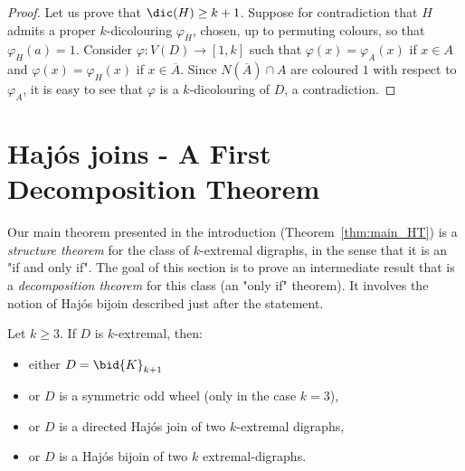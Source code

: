 \begin{proof}
    Let us prove that  $\dic(H) \geq k+1$. %
    Suppose for contradiction that $H$ admits a proper $k$-dicolouring $\varphi_H$, chosen, up to permuting colours, so that $\varphi_H(a) = 1$.
    Consider $\varphi : V(D) \to [1,k]$ such that $\varphi(x) = \varphi_A(x)$ if $x \in A$ and $\varphi(x) = \varphi_{H}(x)$ if $x \in \overline{A}$. 
    Since $N(\overline{A}) \cap A$ are coloured $1$ with respect to $\varphi_A$, it is easy to see that $\varphi$ is a $k$-dicolouring of $D$, a contradiction.
\end{proof}






\section{Haj\'os joins - A First Decomposition Theorem}\label{sec:decthm}
Our main theorem presented in the introduction (Theorem~\ref{thm:main_HT}) is a {\em structure theorem} for the class of $k$-extremal digraphs, in the sense that it is an "if and only if". The goal of this section is to prove an intermediate result that is a {\em decomposition theorem} for this class (an "only if" theorem). It involves the notion of Haj\'os bijoin described just after the statement.

\begin{theorem}\label{thm:decHJHBJ}
Let $k\geq 3$. If $D$ is $k$-extremal, then:
    \begin{itemize}
        \item either $D=\bid{K}_{k+1}$
        \item or $D$ is a symmetric odd wheel (only in the case $k=3$),
        \item or $D$ is a directed Haj\'os join of two $k$-extremal digraphs,
        \item or $D$ is a Haj\'os bijoin of two $k$ extremal-digraphs.
    \end{itemize}
\end{theorem}




